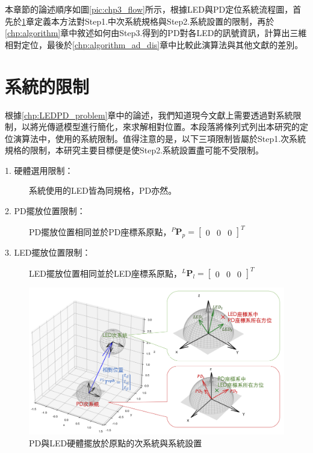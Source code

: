 本章節的論述順序如圖\ref{pic:chp3_flow}所示，根據LED與PD定位系統流程圖，首先於\ref{chp:algorithm_constraint}章定義本方法對Step1.中次系統規格與Step2.系統設置的限制，再於\ref{chp:algorithm}章中敘述如何由Step3.得到的PD對各LED的訊號資訊，計算出三維相對定位，最後於\ref{chp:algorithm_ad_dis}章中比較此演算法與其他文獻的差別。








\section{系統的限制}
\label{chp:algorithm_constraint}

根據\ref{chp:LEDPD_problem}章中的論述，我們知道現今文獻上需要透過對系統限制，以將光傳遞模型進行簡化，來求解相對位置。本段落將條列式列出本研究的定位演算法中，使用的系統限制。值得注意的是，以下三項限制皆屬於Step1.次系統規格的限制，本研究主要目標便是使Step2.系統設置盡可能不受限制。

    \begin{description}

        \item[1. 硬體選用限制：]系統使用的LED皆為同規格，PD亦然。
        \item[2. PD擺放位置限制：]PD擺放位置相同並於PD座標系原點，$^P\boldsymbol{P}_p=
        \left[\begin{array}{ccc}0&0&0\end{array}\right]^T$
        \item[3. LED擺放位置限制：]LED擺放位置相同並於LED座標系原點，$^L\boldsymbol{P}_l=
        \left[\begin{array}{ccc}0&0&0\end{array}\right]^T$

    \end{description}
   
    \begin{figure}[htpb]
        \centering
        \includegraphics[width=15cm]{ch3pic/algorithm_place.png}
        \caption{PD與LED硬體擺放於原點的次系統與系統設置}
        \label{pic:algorithm_coor}
    \end{figure}

